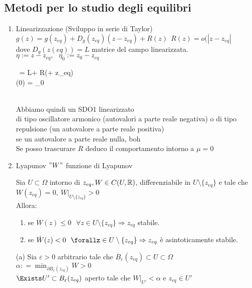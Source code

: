 \documentclass[12px]{article}
\begin{document}
	\subsection{Metodi per lo studio degli equilibri}
	\begin{enumerate}
		\item Linearizzazione (Sviluppo in serie di Taylor)\\
		$g(z) = g(z_{eq}) + D_g(z_{eq})(z-z_{eq}) + R(z) \ \ R(z) = o(|z-z_{eq}|$\\
		dove $D_g(z(eq)) = L$ matrice del campo linearizzata.\\
		$\eta := z - z_{eq},\ \ \ \eta_0 := z_0 - z_{eq}$\\
		\begin{cases}
			\ \dot\eta = L\eta + R(\eta + z_{eq})\ \\ \eta(0) = \eta_0
		\end{cases}\\
		Abbiamo quindi un SDO1 linearizzato\\
		di tipo oscillatore armonico (autovalori a parte reale negativa) o di tipo repulsione (un autovalore a parte reale positiva)\\
		se un autovalore a parte reale nulla, boh\\[10px]
 Se posso trascurare $R$ deduco il comportamento intorno a $\mu = 0$
\item Lyapunov $"W"$ funzione di Lyapunov\\
	\newpage
	\begin{teo}
		Sia $U\subset \Omega$ intorno di  $z_{eq}, W\in C(U,\mathbb{R})$, differenziabile in  $U\setminus\{z_{eq}\}$ e tale che  $W(z_{eq}) = 0, \ W|_{U\setminus\{z_{eq}\}}>0$\\
		Allora: 
		 \begin{enumerate}
			 \item se $\dot W(z) \leq 0\ \ \ \forall z\in U\setminus\{z_{eq}\} \Rightarrow  z_{eq}$ stabile.
			 \item se $\dot W(z) < 0 \ \ \forallz\in U\setminus\{z_{eq}\} \Rightarrow  z_{eq} $ è asintoticamente stabile.
		\end{enumerate}
	\end{teo}
	\begin{dimo}
		(a) Sia $\varepsilon > 0$ arbitrario tale che $\overline B_\varepsilon (z_{eq})\subset U\subset \Omega$\\
		$\displaystyle\alpha : = \min_{\partial B_\varepsilon(z_{eq})} W > 0$\\
		$\Exists U'\subset B_\varepsilon (z_{eq})$ aperto tale che $W|_{U'} < \alpha$ e  $z_{eq}\in U'$ \\

\end{dimo}
\end{enumerate}
\end{document}
